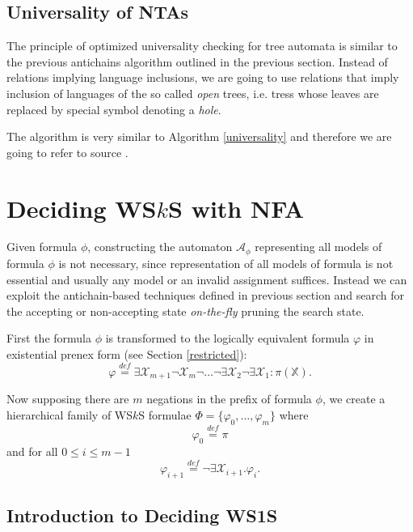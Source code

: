 \subsection{Universality of NTAs}

The principle of optimized universality checking for tree automata is similar to
the previous antichains algorithm outlined in the previous section. Instead of
relations implying language inclusions, we are going to use relations that imply
inclusion of languages of the so called \emph{open} trees, i.e. tress whose
leaves are replaced by special symbol denoting a \emph{hole}.

The algorithm is very similar to Algorithm \ref{universality} and therefore we
are going to refer to source \cite{tacas}.

\section{Deciding WS$k$S with NFA}

Given formula $\phi$, constructing the automaton $\mathcal{A}_\phi$ representing
all models of formula $\phi$ is not necessary, since representation of all
models of formula is not essential and usually any model or an invalid assignment suffices.
Instead we can exploit the antichain-based techniques defined in previous
section and search for the accepting or non-accepting state \emph{on-the-fly}
pruning the search state.

First the formula $\phi$ is transformed to the logically equivalent formula
$\varphi$ in existential prenex form (see Section \ref{restricted}):
\begin{equation*}
 \varphi \overset{\mathit{def}}{=}
 \exists\mathcal{X}_{m+1}\neg\mathcal{X}_m\neg\ldots\neg\exists\mathcal{X}_2\neg\exists\mathcal{X}_1
 :
 \pi(\mathbb{X}).
\end{equation*}

Now supposing there are $m$	negations in the prefix of formula $\phi$, we create
a hierarchical family of WS$k$S formulae $\Phi = \{\varphi_0,\ldots,\varphi_m\}$
where
\begin{equation}
  \varphi_0 \overset{\mathit{def}}{=} \pi
\end{equation}
and for all $0 \leq i \leq m-1$
\begin{equation}
 \varphi_{i+1} \overset{\mathit{def}}{=} \neg\exists\mathcal{X}_{i+1}.
 \varphi_i.
\end{equation}

\subsection{Introduction to Deciding WS1S}

